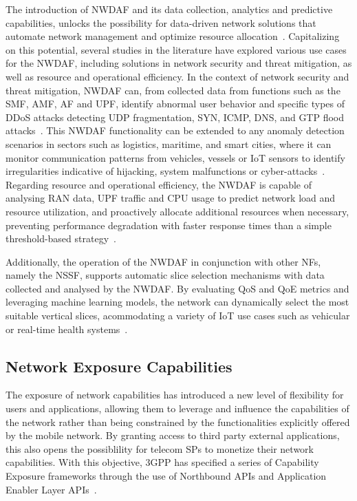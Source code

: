 The introduction of \ac{NWDAF} and its data collection, analytics and predictive capabilities, unlocks the possibility for data-driven network solutions that automate network management and optimize resource allocation~\cite{AdvancingPredictiveSecurity}. Capitalizing on this potential, several studies in the literature have explored various use cases for the \ac{NWDAF}, including solutions in network security and threat mitigation, as well as resource and operational efficiency. In the context of network security and threat mitigation, \ac{NWDAF} can, from collected data from functions such as the \ac{SMF}, \ac{AMF}, \ac{AF} and \ac{UPF}, identify abnormal user behavior and specific types of \ac{DDoS} attacks detecting UDP fragmentation, SYN, ICMP, DNS, and GTP flood attacks~\citep{AdvancingPredictiveSecurity,UserTerminalsAsAttackers}. This \ac{NWDAF} functionality can be extended to any anomaly detection scenarios in sectors such as logistics, maritime, and smart cities, where it can monitor communication patterns from vehicles, vessels or \ac{IoT} sensors to identify irregularities indicative of hijacking, system malfunctions or cyber-attacks~\cite{UserTerminalsAsAttackers}. Regarding resource and operational efficiency, the \ac{NWDAF} is capable of analysing \ac{RAN} data, \ac{UPF} traffic and \acs{CPU} usage to predict network load and resource utilization, and proactively allocate additional resources when necessary, preventing performance degradation with faster response times than a simple threshold-based strategy~\cite{ExplorationNWDAFDevelopmentArchitecture6G}.


Additionally, the operation of the \ac{NWDAF} in conjunction with other \aclp{NF}, namely the \acs{NSSF}, supports automatic slice selection mechanisms with data collected and analysed by the \ac{NWDAF}. By evaluating \acs{QoS} and \acs{QoE} metrics and leveraging machine learning models, the network can dynamically select the most suitable vertical slices, acommodating a variety of \ac{IoT} use cases such as vehicular or real-time health systems~\cite{NetworkSliceSelectorIoT}.

\subsection{Network Exposure Capabilities} \label{sec:network:exposure:mechanisms}

The exposure of network capabilities has introduced a new level of flexibility for users and applications, allowing them to leverage and influence the capabilities of the network rather than being constrained by the functionalities explicitly offered by the mobile network. By granting access to third party external applications, this also opens the possiblility for telecom \acsp{SP} to monetize their network capabilities. With this objective, \acs{3GPP} has specified a series of Capability Exposure frameworks through the use of Northbound \acsp{API} and Application Enabler Layer \acsp{API}~\cite{CapabilityExposure3GPP}.

